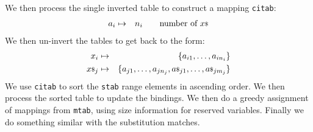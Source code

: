 We then process the single inverted table to construct a mapping \texttt{citab}:
\begin{eqnarray*}
  a_i &\mapsto& n_i \qquad \mbox{number of ${x}{\scriptstyle\$}$}
\end{eqnarray*}
We then un-invert the tables to get back to the form:
\begin{eqnarray*}
  x_i &\mapsto& \{a_{i1},\ldots,a_{in_i}\}
\\ {x}{\scriptstyle\$}_j &\mapsto& \{a_{j1},\ldots,a_{jn_j}, {a}{\scriptstyle\$}_{j1},\ldots,{a}{\scriptstyle\$}_{jm_j}\}
\end{eqnarray*}
We use \texttt{citab} to sort the \texttt{stab} range elements in ascending order.
We then process the sorted table to update the bindings.
We then do a greedy assignment of mappings from  \texttt{mtab},
using size information for reserved variables.
Finally we do something similar with the substitution matches.
